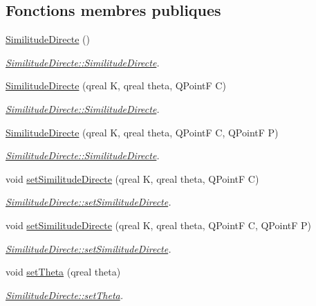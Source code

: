 \subsection*{Fonctions membres publiques}
\begin{DoxyCompactItemize}
\item 
\hyperlink{class_similitude_directe_a7ed5e906e0d9afa4eb5a50f26601b147}{Similitude\+Directe} ()
\begin{DoxyCompactList}\small\item\em \hyperlink{class_similitude_directe_a7ed5e906e0d9afa4eb5a50f26601b147}{Similitude\+Directe\+::\+Similitude\+Directe}. \end{DoxyCompactList}\item 
\hyperlink{class_similitude_directe_a64402a2d779eeedfd5f2ae86625daab5}{Similitude\+Directe} (qreal K, qreal theta, Q\+Point\+F C)
\begin{DoxyCompactList}\small\item\em \hyperlink{class_similitude_directe_a7ed5e906e0d9afa4eb5a50f26601b147}{Similitude\+Directe\+::\+Similitude\+Directe}. \end{DoxyCompactList}\item 
\hyperlink{class_similitude_directe_ad31aec6121a2508b176b32f816a7f5c3}{Similitude\+Directe} (qreal K, qreal theta, Q\+Point\+F C, Q\+Point\+F P)
\begin{DoxyCompactList}\small\item\em \hyperlink{class_similitude_directe_a7ed5e906e0d9afa4eb5a50f26601b147}{Similitude\+Directe\+::\+Similitude\+Directe}. \end{DoxyCompactList}\item 
void \hyperlink{class_similitude_directe_a2d8111830addbc8c5743d218b31ee627}{set\+Similitude\+Directe} (qreal K, qreal theta, Q\+Point\+F C)
\begin{DoxyCompactList}\small\item\em \hyperlink{class_similitude_directe_a2d8111830addbc8c5743d218b31ee627}{Similitude\+Directe\+::set\+Similitude\+Directe}. \end{DoxyCompactList}\item 
void \hyperlink{class_similitude_directe_a1ed9f92c74afc2fc51dfa149355dd3ef}{set\+Similitude\+Directe} (qreal K, qreal theta, Q\+Point\+F C, Q\+Point\+F P)
\begin{DoxyCompactList}\small\item\em \hyperlink{class_similitude_directe_a2d8111830addbc8c5743d218b31ee627}{Similitude\+Directe\+::set\+Similitude\+Directe}. \end{DoxyCompactList}\item 
void \hyperlink{class_similitude_directe_af64456a45860433f87d823a62fb2493d}{set\+Theta} (qreal theta)
\begin{DoxyCompactList}\small\item\em \hyperlink{class_similitude_directe_af64456a45860433f87d823a62fb2493d}{Similitude\+Directe\+::set\+Theta}. \end{DoxyCompactList}\end{DoxyCompactItemize}
